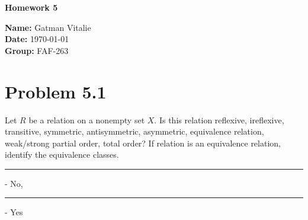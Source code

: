 \documentclass[12pt]{article}
\begin{document}
\begin{titlepage}
    \thispagestyle{fancy} %
    \centering
    
    \vspace*{4cm}

    {\Huge \bfseries Homework 5}

    \vspace{4cm}

    {\Large \textbf{Name:} Gatman Vitalie} \\[0.5em]
    {\Large \textbf{Date:} \today} \\[0.5em]
    {\Large \textbf{Group:} FAF-263}

    \vfill
\end{titlepage}

\newpage

\section*{Problem 5.1}

Let $R$ be a relation on a nonempty set $X$. Is this relation reflexive, ireflexive, transitive, symmetric, antisymmetric, asymmetric, equivalence relation, weak/strong partial order, total order? If relation is an equivalence
relation, identify the equivalence classes.

\textcolor{red}{\rule{1em}{1em}} - No,    \textcolor{ForestGreen}{\rule{1em}{1em}} - Yes
\end{document}

